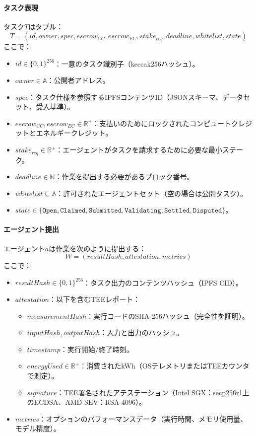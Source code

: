 \documentclass[11pt]{article}
\begin{document}
\paragraph{タスク表現} タスク$T$はタプル：
\begin{equation}
T = (id, owner, spec, escrow_{CC}, escrow_{EC}, stake_{req}, deadline, whitelist, state)
\end{equation}
ここで：
\begin{itemize}[noitemsep]
  \item $id \in \{0,1\}^{256}$：一意のタスク識別子（keccak256ハッシュ）。
  \item $owner \in \mathbb{A}$：公開者アドレス。
  \item $spec$：タスク仕様を参照するIPFSコンテンツID（JSONスキーマ、データセット、受入基準）。
  \item $escrow_{CC}, escrow_{EC} \in \mathbb{R}^+$：支払いのためにロックされたコンピュートクレジットとエネルギークレジット。
  \item $stake_{req} \in \mathbb{R}^+$：エージェントがタスクを請求するために必要な最小ステーク。
  \item $deadline \in \mathbb{N}$：作業を提出する必要があるブロック番号。
  \item $whitelist \subseteq \mathbb{A}$：許可されたエージェントセット（空の場合は公開タスク）。
  \item $state \in \{\texttt{Open}, \texttt{Claimed}, \texttt{Submitted}, \texttt{Validating}, \texttt{Settled}, \texttt{Disputed}\}$。
\end{itemize}

\paragraph{エージェント提出} エージェント$a$は作業を次のように提出する：
\begin{equation}
W = (resultHash, attestation, metrics)
\end{equation}
ここで：
\begin{itemize}[noitemsep]
  \item $resultHash \in \{0,1\}^{256}$：タスク出力のコンテンツハッシュ（IPFS CID）。
  \item $attestation$：以下を含むTEEレポート：
    \begin{itemize}[noitemsep]
      \item $measurementHash$：実行コードのSHA-256ハッシュ（完全性を証明）。
      \item $inputHash, outputHash$：入力と出力のハッシュ。
      \item $timestamp$：実行開始/終了時刻。
      \item $energyUsed \in \mathbb{R}^+$：消費されたkWh（OSテレメトリまたはTEEカウンタで測定）。
      \item $signature$：TEE署名されたアテステーション（Intel SGX：secp256r1上のECDSA、AMD SEV：RSA-4096）。
    \end{itemize}
  \item $metrics$：オプションのパフォーマンスデータ（実行時間、メモリ使用量、モデル精度）。
\end{itemize}
\end{document}

